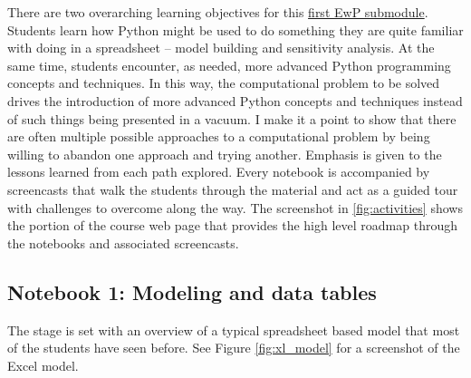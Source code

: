 \documentclass[ited,blindrev]{informs3}              %
\begin{document}
There are two overarching learning objectives for this \href{http://www.sba.oakland.edu/faculty/isken/courses/mis6900/mod3a_whatif.html}{first EwP submodule}. Students learn how Python might be used to do something they are quite familiar with doing in a spreadsheet -- model building and sensitivity analysis. At the same time, students encounter, as needed, more advanced Python programming concepts and techniques. In this way, the computational problem to be solved drives the introduction of more advanced Python concepts and techniques instead of such things being presented in a vacuum. I make it a point to show that there are often multiple possible approaches to a computational problem by being willing to abandon one approach and trying another. Emphasis is given to the lessons learned from each path explored. Every notebook is accompanied by screencasts that walk the students through the material and act as a guided tour with challenges to overcome along the way. The screenshot in \ref{fig:activities} shows the portion of the course web page that provides the high level roadmap through the notebooks and associated screencasts.
 
 
\subsection{Notebook 1: Modeling and data tables}

The stage is set with an overview of a typical spreadsheet based model that most of the students have seen before. See Figure \ref{fig:xl_model} for a screenshot of the Excel model.
\end{document}
